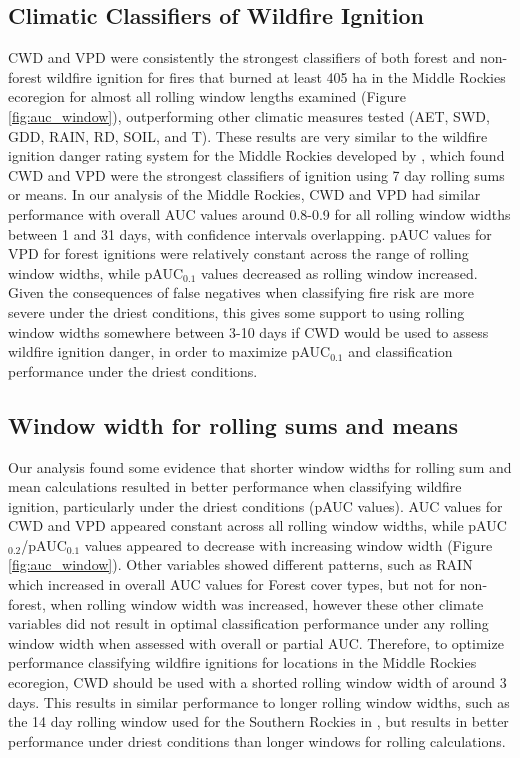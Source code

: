\documentclass[11pt]{article}
\begin{document}
\subsection{Climatic Classifiers of Wildfire Ignition}
CWD and VPD were consistently the strongest classifiers of both forest and non-forest wildfire ignition for fires that burned at least 405 ha in the Middle Rockies ecoregion for almost all rolling window lengths examined (Figure \ref{fig:auc_window}), outperforming other climatic measures tested (AET, SWD, GDD, RAIN, RD, SOIL, and T).  These results are very similar to the wildfire ignition danger rating system for the Middle Rockies developed by , which found CWD and VPD were the strongest classifiers of ignition using 7 day rolling sums or means.  In our analysis of the Middle Rockies, CWD and VPD had similar performance with overall AUC values around 0.8-0.9 for all rolling window widths between 1 and 31 days, with confidence intervals overlapping.  pAUC values for VPD for forest ignitions were relatively constant across the range of rolling window widths, while pAUC$_{0.1}$ values decreased as rolling window increased.  Given the consequences of false negatives when classifying fire risk are more severe under the driest conditions, this gives some support to using rolling window widths somewhere between 3-10 days if CWD would be used to assess wildfire ignition danger, in order to maximize pAUC$_{0.1}$ and classification performance under the driest conditions.

\subsection{Window width for rolling sums and means}

Our analysis found some evidence that shorter window widths for rolling sum and mean calculations resulted in better performance when classifying wildfire ignition, particularly under the driest conditions (pAUC values). AUC values for CWD and VPD appeared constant across all rolling window widths, while pAUC$_{0.2}$/pAUC$_{0.1}$ values appeared to decrease with increasing window width (Figure \ref{fig:auc_window}). Other variables showed different patterns, such as RAIN which increased in overall AUC values for Forest cover types, but not for non-forest, when rolling window width was increased, however these other climate variables did not result in optimal classification performance under any rolling window width when assessed with overall or partial AUC.  Therefore, to optimize performance classifying wildfire ignitions for locations in the Middle Rockies ecoregion, CWD should be used with a shorted rolling window width of around 3 days.  This results in similar performance to longer rolling window widths, such as the 14 day rolling window used for the Southern Rockies in  \citet{thomaWaterBalanceIndicator2020}, but results in better performance under driest conditions than longer windows for rolling calculations.
\end{document}
